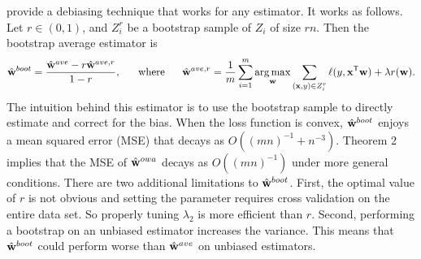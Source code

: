 \documentclass[thesis.tex]{subfiles}
\begin{document}
\citet{zhang2012communication} provide a debiasing technique that works for any estimator.
It works as follows.
Let $r\in(0,1)$, and $Z_i^r$ be a bootstrap sample of $Z_i$ of size $rn$.
Then the bootstrap average estimator is
\begin{equation*}
\hat{\mathbf w}^{boot} = \frac{\hat{\mathbf w}^{ave}-r\hat{\mathbf w}^{ave,r}}{1-r},
\text{~~~~~where~~~~~}
\hat{\mathbf w}^{ave,r} = \frac{1}{m}\sum_{i=1}^m \operatorname*{arg\,max}_\mathbf w \sum_{(\mathbf{x},y)\in Z_i^r} \ell(y,{\mathbf{x}}^{\mathsf{T}}\mathbf w) + \lambda r(\mathbf w)
.
\end{equation*}
The intuition behind this estimator is to use the bootstrap sample to directly estimate and correct for the bias.
When the loss function is convex, $\hat{\mathbf w}^{boot}$ enjoys a mean squared error (MSE) that decays as $O((mn)^{-1}+n^{-3})$. %
Theorem 2 implies that the MSE of $\hat{\mathbf w}^{owa}$ decays as $O((mn)^{-1})$ under more general conditions.
There are two additional limitations to $\hat{\mathbf w}^{boot}$.
First, the optimal value of $r$ is not obvious and setting the parameter requires cross validation on the entire data set.
So properly tuning $\lambda_2$ is more efficient than $r$.
Second, performing a bootstrap on an unbiased estimator increases the variance.
This means that $\hat{\mathbf w}^{boot}$ could perform worse than $\hat{\mathbf w}^{ave}$ on unbiased estimators.
\end{document}
